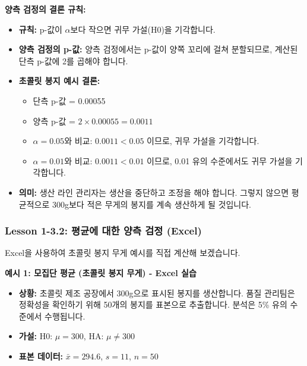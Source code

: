 \documentclass[11pt,a4paper]{book}
\theoremstyle{definition}
\begin{document}
\begin{summarybox}
\textbf{양측 검정의 결론 규칙:}
\begin{itemize}
    \item \textbf{규칙:} p-값이 $\alpha$보다 작으면 귀무 가설(H0)을 기각합니다.
    \item \textbf{양측 검정의 p-값:} 양측 검정에서는 p-값이 양쪽 꼬리에 걸쳐 분할되므로, 계산된 단측 p-값에 2를 곱해야 합니다.
    \item \textbf{초콜릿 봉지 예시 결론:}
        \begin{itemize}
            \item 단측 p-값 = 0.00055
            \item 양측 p-값 = $2 \times 0.00055 = 0.0011$
            \item $\alpha = 0.05$와 비교: $0.0011 < 0.05$ 이므로, 귀무 가설을 기각합니다.
            \item $\alpha = 0.01$와 비교: $0.0011 < 0.01$ 이므로, 0.01 유의 수준에서도 귀무 가설을 기각합니다.
        \end{itemize}
    \item \textbf{의미:} 생산 라인 관리자는 생산을 중단하고 조정을 해야 합니다. 그렇지 않으면 평균적으로 300g보다 적은 무게의 봉지를 계속 생산하게 될 것입니다.
\end{itemize}
\end{summarybox}


\subsubsection{Lesson 1-3.2: 평균에 대한 양측 검정 (Excel)}

Excel을 사용하여 초콜릿 봉지 무게 예시를 직접 계산해 보겠습니다.

\begin{examplebox}
\textbf{예시 1: 모집단 평균 (초콜릿 봉지 무게) - Excel 실습}
\begin{itemize}
    \item \textbf{상황:} 초콜릿 제조 공장에서 300g으로 표시된 봉지를 생산합니다. 품질 관리팀은 정확성을 확인하기 위해 50개의 봉지를 표본으로 추출합니다. 분석은 5\% 유의 수준에서 수행됩니다.
    \item \textbf{가설:} H0: $\mu = 300$, HA: $\mu \ne 300$
    \item \textbf{표본 데이터:} $\bar{x} = 294.6$, $s = 11$, $n = 50$
\end{itemize}
\end{examplebox}
\end{document}
